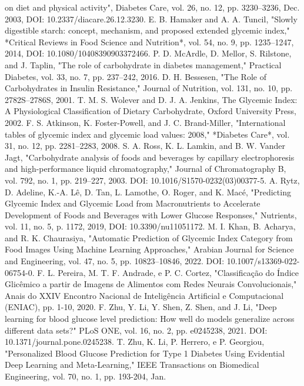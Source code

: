 \documentclass[conference]{IEEEtran}
\begin{document}
\begin{thebibliography}{00}
on diet and physical activity", Diabetes Care, vol. 26, no. 12, pp. 3230–3236, Dec. 2003, DOI: 10.2337/diacare.26.12.3230.
 E. B. Hamaker and A. A. Tuncil, "Slowly digestible starch: concept, mechanism, and proposed extended glycemic
index," *Critical Reviews in Food Science and Nutrition*, vol. 54, no. 9, pp. 1235–1247, 2014, DOI:
10.1080/10408390903372466.
 P. D. McArdle, D. Mellor, S. Rilstone, and J. Taplin, "The role of carbohydrate in diabetes management,"
Practical Diabetes, vol. 33, no. 7, pp. 237–242, 2016.
 D. H. Bessesen, "The Role of Carbohydrates in Insulin Resistance," Journal of Nutrition, vol. 131, no. 10,
pp. 2782S–2786S, 2001.
 T. M. S. Wolever and D. J. A. Jenkins, The Glycemic Index: A Physiological Classification of Dietary
Carbohydrate, Oxford University Press, 2002.
 F. S. Atkinson, K. Foster-Powell, and J. C. Brand-Miller, "International tables of glycemic index and
glycemic load values: 2008," *Diabetes Care*, vol. 31, no. 12, pp. 2281–2283, 2008.
 S. A. Ross, K. L. Lamkin, and B. W. Vander Jagt, "Carbohydrate analysis of foods and beverages by capillary
electrophoresis and high-performance liquid chromatography," Journal of Chromatography B, vol. 792, no. 1, pp. 219–227,
2003. DOI: 10.1016/S1570-0232(03)00377-5.
 A. Rytz, D. Adeline, K.-A. Lê, D. Tan, L. Lamothe, O. Roger, and K. Macé, "Predicting Glycemic Index and
Glycemic Load from Macronutrients to Accelerate Development of Foods and Beverages with Lower Glucose Responses,"
Nutrients, vol. 11, no. 5, p. 1172, 2019, DOI: 10.3390/nu11051172.
 M. I. Khan, B. Acharya, and R. K. Chaurasiya, "Automatic Prediction of Glycemic Index Category from Food
Images Using Machine Learning Approaches," Arabian Journal for Science and Engineering, vol. 47, no. 5, pp. 10823–10846,
2022. DOI: 10.1007/s13369-022-06754-0.
 F. L. Pereira, M. T. F. Andrade, e P. C. Cortez, "Classificação do Índice Glicêmico a partir de Imagens de
Alimentos com Redes Neurais Convolucionais," Anais do XXIV Encontro Nacional de Inteligência Artificial e Computacional
(ENIAC), pp. 1-10, 2020.
 F. Zhu, Y. Li, Y. Shen, Z. Shen, and J. Li, "Deep learning for blood glucose level prediction: How well do
models generalize across different data sets?" PLoS ONE, vol. 16, no. 2, pp. e0245238, 2021. DOI:
10.1371/journal.pone.0245238.
 T. Zhu, K. Li, P. Herrero, e P. Georgiou, "Personalized Blood Glucose Prediction for Type 1 Diabetes Using
Evidential Deep Learning and Meta-Learning," IEEE Transactions on Biomedical Engineering, vol. 70, no. 1, pp. 193-204, Jan.

\end{thebibliography}
\end{document}
